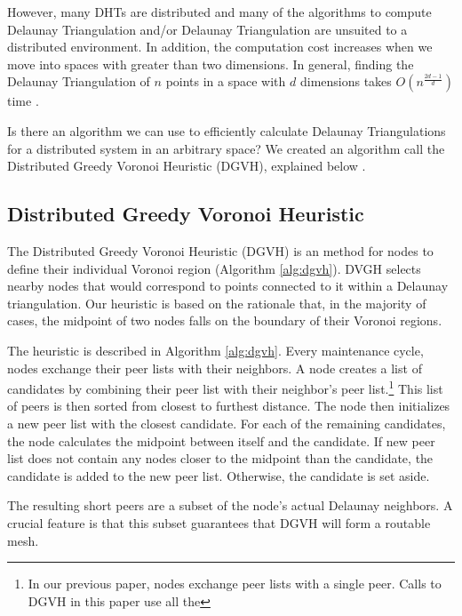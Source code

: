\documentclass[11pt,conference]{IEEEtran}
\begin{document}
However, many DHTs are distributed and many of the algorithms to compute Delaunay Triangulation and/or Delaunay Triangulation are unsuited to a distributed environment.
In addition, the computation cost increases when we move into spaces with greater than two dimensions.
In general, finding the Delaunay Triangulation of $n$ points in a space with $d$ dimensions takes $O(n^{\frac{2d-1}{d}})$ time \cite{watson1981computing}.


Is there an algorithm we can use to efficiently calculate Delaunay Triangulations for a distributed system in an arbitrary space?
We created an algorithm call the Distributed Greedy Voronoi Heuristic (DGVH), explained below \cite{dgvh}.


\subsection{Distributed Greedy Voronoi Heuristic}
\label{sec:dgvh}


The Distributed Greedy Voronoi Heuristic (DGVH) is an method for nodes to define their individual Voronoi region (Algorithm \ref{alg:dgvh}). 
DVGH selects nearby nodes that would correspond to points connected to it within a Delaunay triangulation.
Our heuristic is based on the rationale that, in the majority of cases, the midpoint of two nodes falls on the boundary of their Voronoi regions.

The heuristic is described in Algorithm \ref{alg:dgvh}.
Every maintenance cycle, nodes exchange their peer lists with their neighbors.
A node creates a list of candidates by combining their peer list with their neighbor's peer list.\footnote{In our previous paper, nodes exchange peer lists with a single peer. Calls to DGVH in this paper use all the }
This list of peers is then sorted from closest to furthest distance.
The node then initializes a new peer list with the closest candidate.
For each of the remaining candidates, the node calculates the midpoint between itself and the candidate.
If new peer list does not contain any nodes closer to the midpoint than the candidate, the candidate is added to the new peer list.
Otherwise, the candidate is set aside.

The resulting short peers are a subset of the node's actual Delaunay neighbors.
A crucial feature is that this subset guarantees that DGVH will form a routable mesh.
\end{document}
